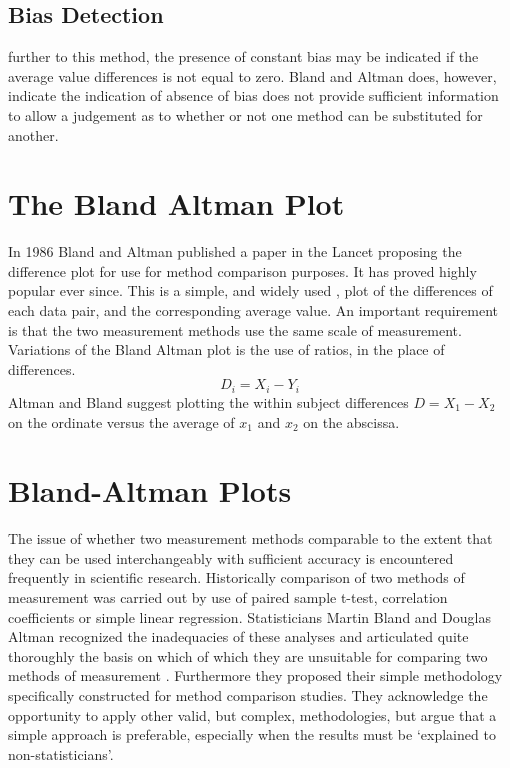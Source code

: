 \documentclass[Main.tex]{subfiles}
\begin{document}
	
	\subsection{Bias Detection}
	further to this method, the presence of constant bias may be
	indicated if the average value differences is not equal to zero.
	Bland and Altman does, however, indicate the indication of absence
	of bias does not provide sufficient information to allow a
	judgement as to whether or not one method can be substituted for
	another.
	
	
	
	

	\section{The Bland Altman Plot}
	In 1986 Bland and Altman published a paper in the Lancet proposing
	the difference plot for use for method comparison purposes. It has
	proved highly popular ever since. This is a simple, and widely
	used , plot of the differences of each data pair, and the
	corresponding average value. An important requirement is that the
	two measurement methods use the same scale of measurement.
	\\
	Variations of the Bland Altman plot is the use of ratios, in the
	place of differences.
	\begin{equation}
	D_{i} = X_{i} - Y_{i}   \label{BA01}
	\end{equation}
	Altman and Bland suggest plotting the within subject differences $
	D = X_{1} - X_{2} $ on the ordinate versus the average of $x_{1}$
	and  $x_{2}$ on the abscissa.
	

	
	
	\section{Bland-Altman Plots}
	The issue of whether two measurement methods comparable to the
	extent that they can be used interchangeably with sufficient
	accuracy is encountered frequently in scientific research.
	Historically comparison of two methods of measurement was carried
	out by use of paired sample t-test, correlation coefficients or
	simple linear regression. Statisticians Martin Bland and Douglas
	Altman recognized the inadequacies of these analyses and
	articulated quite thoroughly the basis on which of which they are
	unsuitable for comparing two methods of measurement \citep*{BA83}.
	Furthermore they proposed their simple methodology specifically
	constructed for method comparison studies. They acknowledge the
	opportunity to apply other valid, but complex, methodologies, but
	argue that a simple approach is preferable, especially when the
	results must be `explained to non-statisticians'.
	
\end{document}
